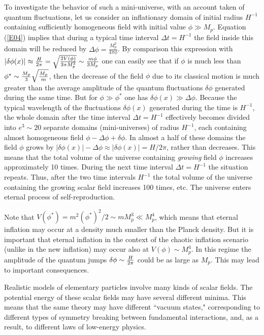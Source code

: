 \documentclass[a4paper,12pt]{article}
\begin{document}
To investigate the behavior of such a mini-universe, with an account
taken of quantum fluctuations, let us consider an inflationary domain of
initial radius $H^{-1}$ containing sufficiently homogeneous field with
initial value $\phi \gg M_p$. Equation (\ref{E04}) implies that during a
typical time interval $\Delta t=H^{-1}$ the field inside this domain will
be reduced by $\Delta\phi = \frac{M_p^2}{4\pi\phi}$. By comparison this
expression with $|\delta\phi(x)| \approx \frac{H}{2\pi} = \sqrt{2V(\phi)
\over 3\pi M_p^2 } \sim {m\phi\over 3 M_p}$  one can easily see that if
$\phi$ is much less than $\phi^* \sim {M_p\over 3}\sqrt{M_p\over m} $,
 then the decrease of the field $\phi$
due to its classical motion is much greater than the average amplitude of
the quantum fluctuations $\delta\phi$ generated during the same time. But
for   $\phi \gg \phi^*$ one has   $\delta\phi (x) \gg \Delta\phi$.
Because the typical wavelength of the fluctuations $\delta\phi (x)$
generated during the time is $H^{-1}$, the whole domain after the time interval $\Delta t =
H^{-1}$ effectively becomes divided into $e^3 \sim 20$ separate domains
(mini-universes) of radius $H^{-1}$, each containing almost homogeneous
field $\phi - \Delta\phi+\delta\phi$.   In almost a half of these domains
the field $\phi$ grows by $|\delta\phi(x)|-\Delta\phi \approx |\delta\phi
(x)| = H/2\pi$, rather than decreases. This means that the total volume
of the universe containing {\it growing} field $\phi$ increases approximately 10 times. During the next time interval $\Delta t = H^{-1}$ the situation repeats.
Thus, after the two time  intervals $H^{-1}$ the total volume of the
universe containing the growing scalar field increases 100 times, etc.
The universe enters eternal process of self-reproduction.
 




Note that   $V(\phi^*) = m^2(\phi^*)^2/2 \sim m M_p^3 \ll M_p^4$, which means that eternal inflation may occur at a density much smaller than the Planck density. But it is important that eternal inflation in the context of the chaotic inflation scenario  (unlike in the new inflation) may occur also at $V(\phi) \sim M_p^4$. In this regime  the amplitude of the quantum jumps $\delta \phi\sim {H\over 2\pi}$  could be as large as $M_p$. This may lead to important consequences.

Realistic models of elementary particles involve many kinds
of scalar fields. 
The potential energy of these scalar fields may have several different
minima. This means that the same theory may have different ``vacuum
states," corresponding to different types of symmetry breaking between
fundamental interactions, and, as a result, to different laws of
low-energy physics.
\end{document}
